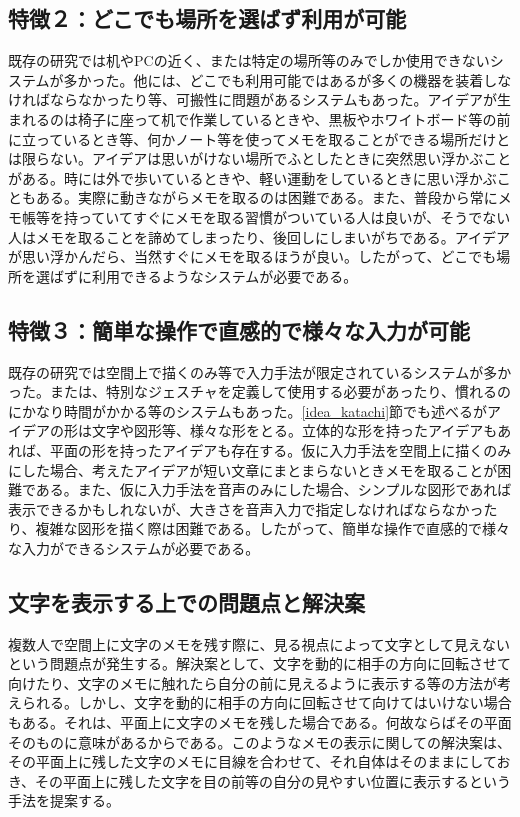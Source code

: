 \documentclass[11pt,a4j, titlepage]{jarticle} %
\begin{document}
\subsection*{特徴２：どこでも場所を選ばず利用が可能}
既存の研究では机やPCの近く、または特定の場所等のみでしか使用できないシステムが多かった。他には、どこでも利用可能ではあるが多くの機器を装着しなければならなかったり等、可搬性に問題があるシステムもあった。アイデアが生まれるのは椅子に座って机で作業しているときや、黒板やホワイトボード等の前に立っているとき等、何かノート等を使ってメモを取ることができる場所だけとは限らない。アイデアは思いがけない場所でふとしたときに突然思い浮かぶことがある。時には外で歩いているときや、軽い運動をしているときに思い浮かぶこともある。実際に動きながらメモを取るのは困難である。また、普段から常にメモ帳等を持っていてすぐにメモを取る習慣がついている人は良いが、そうでない人はメモを取ることを諦めてしまったり、後回しにしまいがちである。アイデアが思い浮かんだら、当然すぐにメモを取るほうが良い。したがって、どこでも場所を選ばずに利用できるようなシステムが必要である。

\subsection*{特徴３：簡単な操作で直感的で様々な入力が可能}
既存の研究では空間上で描くのみ等で入力手法が限定されているシステムが多かった。または、特別なジェスチャを定義して使用する必要があったり、慣れるのにかなり時間がかかる等のシステムもあった。\ref{idea_katachi}節でも述べるがアイデアの形は文字や図形等、様々な形をとる。立体的な形を持ったアイデアもあれば、平面の形を持ったアイデアも存在する。仮に入力手法を空間上に描くのみにした場合、考えたアイデアが短い文章にまとまらないときメモを取ることが困難である。また、仮に入力手法を音声のみにした場合、シンプルな図形であれば表示できるかもしれないが、大きさを音声入力で指定しなければならなかったり、複雑な図形を描く際は困難である。したがって、簡単な操作で直感的で様々な入力ができるシステムが必要である。

\subsection{文字を表示する上での問題点と解決案} \label{moji_mondai}
複数人で空間上に文字のメモを残す際に、見る視点によって文字として見えないという問題点が発生する。解決案として、文字を動的に相手の方向に回転させて向けたり、文字のメモに触れたら自分の前に見えるように表示する等の方法が考えられる。しかし、文字を動的に相手の方向に回転させて向けてはいけない場合もある。それは、平面上に文字のメモを残した場合である。何故ならばその平面そのものに意味があるからである。このようなメモの表示に関しての解決案は、その平面上に残した文字のメモに目線を合わせて、それ自体はそのままにしておき、その平面上に残した文字を目の前等の自分の見やすい位置に表示するという手法を提案する。
\end{document}
